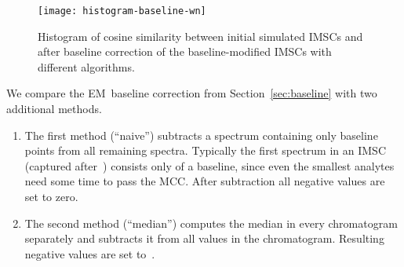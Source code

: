 \documentclass{article}
\begin{document}
\begin{figure}[t]\centering
\texttt{[image: histogram-baseline-wn]}
\caption{Histogram of cosine similarity between initial simulated IMSCs and after baseline correction of the baseline-modified IMSCs with different algorithms.}
\label{fig:baselineresults}
\end{figure}

We compare the EM~baseline correction from Section~\ref{sec:baseline} with two additional methods.
\begin{enumerate}
\item
The first method (``naive'') subtracts a spectrum containing only baseline points from all remaining spectra.
Typically the first spectrum in an IMSC (captured after~) consists only of a baseline, since even the smallest analytes need some time to pass the MCC.
After subtraction all negative values are set to zero.
\item
The second method (``median'') computes the median in every chromatogram separately and subtracts it from all values in the chromatogram.
Resulting negative values are set to~.
\end{enumerate}
\end{document}
